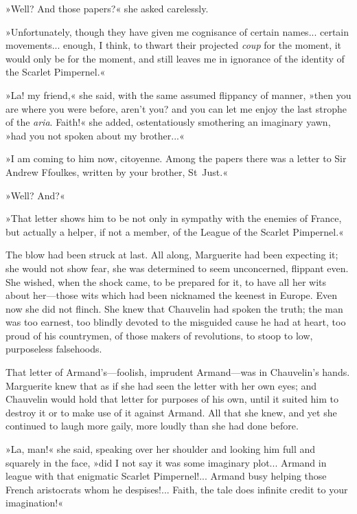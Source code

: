»Well? And those papers?« she asked carelessly.

»Unfortunately, though they have given me cognisance of certain names... certain movements... enough, I think, to thwart their projected \textit{coup} for the moment, it would only be for the moment, and still leaves me in ignorance of the identity of the Scarlet Pimpernel.«

»La! my friend,« she said, with the same assumed flippancy of manner, »then you are where you were before, aren't you? and you can let me enjoy the last strophe of the \textit{aria}. Faith!« she added, ostentatiously smothering an imaginary yawn, »had you not spoken about my brother...«

»I am coming to him now, citoyenne. Among the papers there was a letter to Sir Andrew Ffoulkes, written by your brother, St~Just.«

»Well? And?«

»That letter shows him to be not only in sympathy with the enemies of France, but actually a helper, if not a member, of the League of the Scarlet Pimpernel.«

The blow had been struck at last. All along, Marguerite had been expecting it; she would not show fear, she was determined to seem unconcerned, flippant even. She wished, when the shock came, to be prepared for it, to have all her wits about her\allowbreak---\allowbreak those wits which had been nicknamed the keenest in Europe. Even now she did not flinch. She knew that Chauvelin had spoken the truth; the man was too earnest, too blindly devoted to the misguided cause he had at heart, too proud of his countrymen, of those makers of revolutions, to stoop to low, purposeless falsehoods.

That letter of Armand's\allowbreak---\allowbreak foolish, imprudent Armand\allowbreak---\allowbreak was in Chauvelin's hands. Marguerite knew that as if she had seen the letter with her own eyes; and Chauvelin would hold that letter for purposes of his own, until it suited him to destroy it or to make use of it against Armand. All that she knew, and yet she continued to laugh more gaily, more loudly than she had done before.

»La, man!« she said, speaking over her shoulder and looking him full and squarely in the face, »did I not say it was some imaginary plot... Armand in league with that enigmatic Scarlet Pimpernel!... Armand busy helping those French aristocrats whom he despises!... Faith, the tale does infinite credit to your imagination!«

